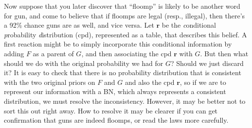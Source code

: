 \documentclass{article}
\theoremstyle{plain}
\theoremstyle{definition}
\newenvironment{example}
	{\pushQED{\qed}\renewcommand{\qedsymbol}{$\triangle$}\examplex}
	{\popQED\endexamplex%
}
\theoremstyle{remark}
\newcommand\mat[1]{\mathbf{#1}}
\numberwithin{equation}{section}
\begin{document}
\begin{example}
		Now suppose that you later discover that ``floomp'' is likely to be another word for gun, and come to believe that if floomps are legal (resp., illegal), then there's a 92\% chance guns are as well, and vice versa. Let $\mat r$ be the 
		\emph conditional \emph probability \emph distribution (cpd), represented as a table,
		that describes this belief. A first reaction might be to simply incorporate this conditional information by adding $F$ as a parent of $G$, and then associating the cpd $\mat r$ with $G$. But then what should we do with the original probability we had for $G$?  Should we just discard it?
		It is easy to check that there is no probability distribution that is consistent with the two original priors on $F$ and $G$ and also the cpd $\mat r$, so if we are to represent our information with a BN, which always represents a consistent distribution, we must resolve the inconsistency.  
%		
		However, it may be better not to sort this out right away. How to resolve it may be clearer if you can get confirmation that guns are indeed floomps, or read the laws more carefully.


\end{example}
\end{document}
